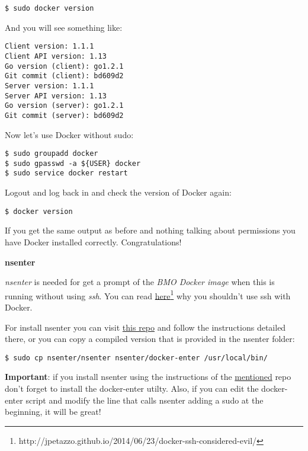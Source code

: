 \vspace*{3mm}
\begin{lstlisting}
$ sudo docker version
\end{lstlisting}

And you will see something like:

\vspace*{3mm}
\begin{lstlisting}
Client version: 1.1.1
Client API version: 1.13
Go version (client): go1.2.1
Git commit (client): bd609d2
Server version: 1.1.1
Server API version: 1.13
Go version (server): go1.2.1
Git commit (server): bd609d2
\end{lstlisting}

Now let's use Docker without sudo:

\vspace*{3mm}
\begin{lstlisting}
$ sudo groupadd docker
$ sudo gpasswd -a ${USER} docker
$ sudo service docker restart
\end{lstlisting}

Logout and log back in and check the version of Docker again:

\vspace*{3mm}
\begin{lstlisting}
$ docker version
\end{lstlisting}

If you get the same output as before and nothing talking about permissions you have Docker installed correctly. Congratulations!

\large
\textbf{nsenter}

\normalsize
\emph{nsenter} is needed for get a prompt of the \emph{BMO Docker image} when this is running without using \emph{ssh}. You can read \href{http://jpetazzo.github.io/2014/06/23/docker-ssh-considered-evil/}{here}\footnote{http://jpetazzo.github.io/2014/06/23/docker-ssh-considered-evil/} why you shouldn't use ssh with Docker.

For install nsenter you can visit \href{https://github.com/jpetazzo/nsenter}{this repo} and follow the instructions detailed there, or you can copy a compiled version that is provided in the nsenter folder:

\vspace*{3mm}
\begin{lstlisting}
$ sudo cp nsenter/nsenter nsenter/docker-enter /usr/local/bin/
\end{lstlisting}

\textbf{Important}: if you install nsenter using the instructions of the \href{http://jpetazzo.github.io/2014/06/23/docker-ssh-considered-evil/}{mentioned} repo don't forget to install the docker-enter utilty. Also, if you can edit the docker-enter script and modify the line that calls nsenter adding a sudo at the beginning, it will be great!

